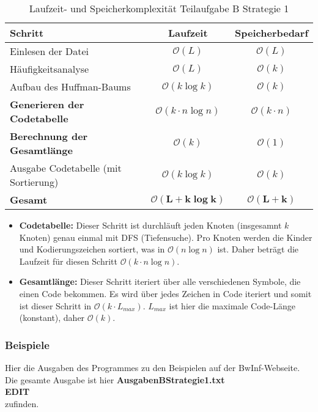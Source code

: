 \documentclass[a4paper,10pt,ngerman]{scrartcl}
\begin{document}
\begin{table}[H]
\centering
\begin{tabular}{|l|c|c|}
\hline
\textbf{Schritt} & \textbf{Laufzeit} & \textbf{Speicherbedarf} \\
\hline
Einlesen der Datei & $\mathcal{O}(L)$ & $\mathcal{O}(L)$ \\
Häufigkeitsanalyse & $\mathcal{O}(L)$ & $\mathcal{O}(k)$ \\
Aufbau des Huffman-Baums & $\mathcal{O}(k \log k)$ & $\mathcal{O}(k)$ \\
\textbf{Generieren der Codetabelle} & $\mathcal{O}(k \cdot n \log n)$ & $\mathcal{O}(k \cdot n)$ \\
\textbf{Berechnung der Gesamtlänge} & $\mathcal{O}(k)$ & $\mathcal{O}(1)$ \\
Ausgabe Codetabelle (mit Sortierung) & $\mathcal{O}(k \log k)$ & $\mathcal{O}(k)$ \\
\hline
\textbf{Gesamt} & $\boldsymbol{\mathcal{O}(L + k \log k)}$ & $\boldsymbol{\mathcal{O}(L + k)}$ \\
\hline
\end{tabular}
\caption{Laufzeit- und Speicherkomplexität Teilaufgabe B Strategie 1}
\end{table}

\vspace{1em}

\begin{itemize}
  \item \textbf{Codetabelle:} Dieser Schritt ist durchläuft jeden Knoten (insgesamnt $k$ Knoten) genau einmal mit DFS (Tiefensuche). Pro Knoten werden die Kinder und Kodierungszeichen sortiert, was in $\mathcal{O}(n \log n)$ ist. Daher beträgt die Laufzeit für diesen Schritt $\mathcal{O}(k \cdot n \log n)$.

  \item \textbf{Gesamtlänge:} Dieser Schritt iteriert über alle verschiedenen Symbole, die einen Code bekommen. Es wird über jedes Zeichen in Code iteriert und somit ist dieser Schritt in $\mathcal{O}(k \cdot L_{max})$. $L_{max}$ ist hier die maximale Code-Länge (konstant), daher $\mathcal{O}(k)$.
\end{itemize}
\subsubsection{Beispiele}
Hier die Ausgaben des Programmes zu den Beispielen auf der BwInf-Webseite. \\Die gesamte Ausgabe ist hier \textbf{AusgabenBStrategie1.txt} \\ \newline \textbf{EDIT} \\ \newline zufinden. 
\end{document}
